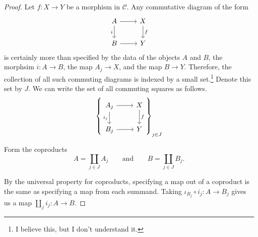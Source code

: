 \documentclass[main.tex]{subfiles}
\begin{document}
\begin{proof}
  Let $f\colon X \to Y$ be a morphism in $\mathcal{C}$. Any commutative diagram of the form
  \begin{equation*}
    \begin{tikzcd}
      A
      \arrow[r]
      \arrow[d, swap, "i"]
      & X
      \arrow[d, "f"]
      \\
      B
      \arrow[r]
      & Y
    \end{tikzcd}
  \end{equation*}
  is certainly more than specified by the data of the objects $A$ and $B$, the morphsim $i\colon A \to B$, the map $A_{j} \to X$, and the map $B \to Y$. Therefore, the collection of all such commuting diagrams is indexed by a small set.\footnote{I believe this, but I don't understand it.} Denote this set by $J$. We can write the set of all commuting squares as follows.
  \begin{equation*}
    \left\{
      \begin{tikzcd}
        A_{j}
        \arrow[r]
        \arrow[d, swap, "i_{j}"]
        & X
        \arrow[d, "f"]
        \\
        B_{j}
        \arrow[r]
        & Y
      \end{tikzcd}
    \right\}_{j \in J}
  \end{equation*}

  Form the coproducts
  \begin{equation*}
    A = \coprod_{j \in J} A_{j} \qquad\text{and}\qquad B = \coprod_{j \in J} B_{j}.
  \end{equation*}

  By the universal property for coproducts, specifying a map out of a coproduct is the same as specifying a map from each summand. Taking $\iota_{B_{j}} \circ i_{j}\colon A \to B_{j}$ gives us a map $\amalg_{j} i_{j}\colon A \to B$.


\end{proof}
\end{document}

